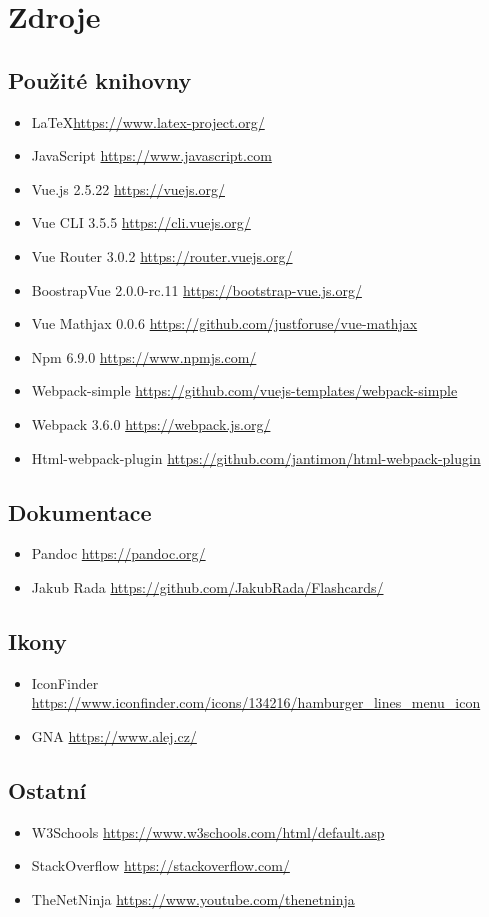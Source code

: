 \section{Zdroje}

\subsection{Použité knihovny}

\begin{itemize}
\tightlist
\item \LaTeX \url{https://www.latex-project.org/}
\item JavaScript \url{https://www.javascript.com}
\item Vue.js 2.5.22 \url{https://vuejs.org/}
\item Vue CLI 3.5.5 \url{https://cli.vuejs.org/}
\item Vue Router 3.0.2 \url{https://router.vuejs.org/}
\item BoostrapVue 2.0.0-rc.11 \url{https://bootstrap-vue.js.org/}
\item Vue Mathjax 0.0.6 \url{https://github.com/justforuse/vue-mathjax}
\item Npm 6.9.0 \url{https://www.npmjs.com/}
\item Webpack-simple \url{https://github.com/vuejs-templates/webpack-simple}
\item Webpack 3.6.0 \url{https://webpack.js.org/}
\item Html-webpack-plugin \url{https://github.com/jantimon/html-webpack-plugin}
\end{itemize}

\subsection{Dokumentace}

\begin{itemize}
\tightlist
\item Pandoc \url{https://pandoc.org/}
\item Jakub Rada \url{https://github.com/JakubRada/Flashcards/}
\end{itemize}

\subsection{Ikony}

\begin{itemize}
\tightlist
\item IconFinder \url{https://www.iconfinder.com/icons/134216/hamburger_lines_menu_icon}
\item GNA \url{https://www.alej.cz/}
\end{itemize}

\subsection{Ostatní}

\begin{itemize}
\tightlist
\item W3Schools \url{https://www.w3schools.com/html/default.asp}
\item StackOverflow \url{https://stackoverflow.com/}
\item TheNetNinja \url{https://www.youtube.com/thenetninja}
\end{itemize}